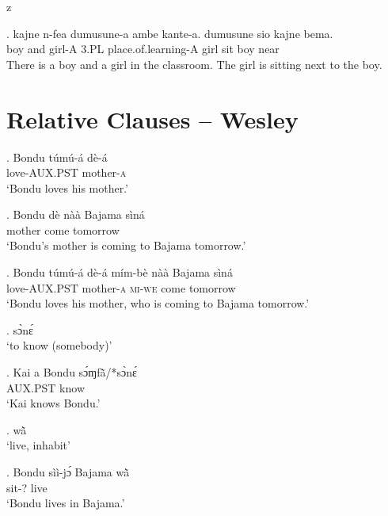 z   \documentclass{assets/fieldnotes}
\begin{document}
\begin{itemize}
   \exg. kajne n-fea dumusune-a ambe kante-a. dumusune sio kajne bema.\\
   boy and girl-A 3.PL place.of.learning-A girl sit boy near\\
   There is a boy and a girl in the classroom. The girl is sitting next to the boy.



    
\end{itemize}

\section{Relative Clauses -- Wesley}


\exg. Bondu túmú-á dè-á\\
{} love-\textsc{AUX.PST} mother-\textsc{a}\\
`Bondu loves his mother.’\\

\exg. Bondu dè nàà Bajama sìná\\
{} mother come {} tomorrow\\
`Bondu’s mother is coming to Bajama tomorrow.’

\exg. Bondu túmú-á dè-á mím-bè nàà Bajama sìná \\
{} love-\textsc{AUX.PST} mother-\textsc{a} \textsc{mi-we} come {} tomorrow\\
`Bondu loves his mother, who is coming to Bajama tomorrow.’

\ex. sɔ̀nɛ́\\`to know (somebody)’

\exg. Kai a Bondu sɔ́ɱfã̀/*sɔ̀nɛ́\\
{} \textsc{AUX.PST} {} know\\
`Kai knows Bondu.’

\ex. wã̀\\`live, inhabit’

\exg. Bondu sìì-jɔ́ Bajama wã̀\\
{} sit-? {} live\\
`Bondu lives in Bajama.’\\
\end{document}
